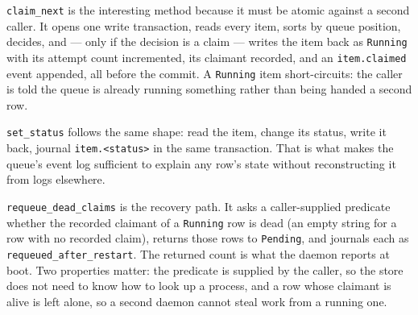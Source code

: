 \begin{center}
\end{center}

\texttt{claim\_next} is the interesting method because it must be atomic against a second
caller. It opens one write transaction, reads every item, sorts by queue position, decides,
and --- only if the decision is a claim --- writes the item back as \texttt{Running} with its
attempt count incremented, its claimant recorded, and an \texttt{item.claimed} event appended,
all before the commit. A \texttt{Running} item short-circuits: the caller is told the queue is
already running something rather than being handed a second row.

\texttt{set\_status} follows the same shape: read the item, change its status, write it back,
journal \texttt{item.<status>} in the same transaction. That is what makes the queue's event
log sufficient to explain any row's state without reconstructing it from logs elsewhere.

\texttt{requeue\_dead\_claims} is the recovery path. It asks a caller-supplied predicate
whether the recorded claimant of a \texttt{Running} row is dead (an empty string for a row
with no recorded claim), returns those rows to \texttt{Pending}, and journals each as
\texttt{requeued\_after\_restart}. The returned count is what the daemon reports at boot. Two
properties matter: the predicate is supplied by the caller, so the store does not need to know
how to look up a process, and a row whose claimant is alive is left alone, so a second daemon
cannot steal work from a running one.

